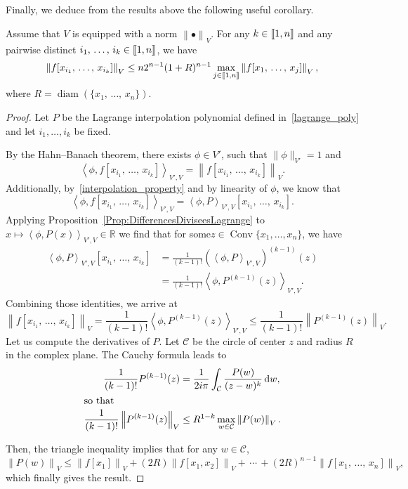 \documentclass[10pt]{amsart}
\theoremstyle{definition}\newtheorem{defi}[theo]{Definition}\newtheorem{rema}[theo]{Remark}\newtheorem{exam}[theo]{Example}\newtheorem{exem}[theo]{Example}\newtheorem{nota}[theo]{Notation}
\DeclareMathOperator{\Conv}{Conv}
\newcommand{\llbracket}{\mathopen{[\mkern -2.7mu[}}
\newcommand{\rrbracket}{\mathclose{]\mkern -2.7mu]}}
\newcommand{\inter}[2]{\llbracket #1,#2 \rrbracket}
\newcommand{\normeV}[1]{\left\| #1 \right\|_V}
\newcommand{\dualV}[2]{\left\langle #1, #2 \right\rangle_{V',V}}
\newcommand{\CC}{\mathcal{C}}
\newcommand{\R}{\mathbb{R}}
\newcommand{\md}{\mathrm{d}}
\DeclareMathOperator{\diam}{diam}
\renewcommand{\cdot}{{\scriptstyle \bullet}}
\begin{document}
Finally, we deduce from the results above the following useful corollary.
\begin{coro}\label{Coro:esti_diff_divisees_quelconques}
Assume that $V$ is equipped with a norm $\normeV{\cdot}$. For any $k\in \inter{1}{n}$ and any pairwise distinct $i_1,\,\dotsc,\,i_k\in \inter{1}{n}$, we have
\[
\normeV{f[x_{i_1},\,\dotsc,\,x_{i_k}]} \leq n 2^{n-1} (1+R)^{n-1} \max\limits_{j\in \inter{1}{n}} \normeV{f[x_1,\,\dotsc,\,x_j]},
\]
where $R=\diam(\{x_1,\,\dotsc,\,x_n\})$.
\end{coro}

\begin{proof}
Let $P$ be the Lagrange interpolation polynomial defined in~\eqref{lagrange_poly} and let $i_1,\dotsc,i_k$ be fixed.

By the Hahn--Banach theorem, there exists $\phi\in V'$, such that $\| \phi \|_{V'}=1$ and
\[
\dualV{\phi}{f[x_{i_1},\,\dotsc,\,x_{i_k}]} = \normeV{f[x_{i_1},\,\dotsc,\,x_{i_k}]}.
\]
Additionally, by~\eqref{interpolation_property} and by linearity of $\phi$, we know that
\[
\dualV{\phi}{f[x_{i_1},\,\dotsc,\,x_{i_k}]} = \dualV{\phi}{P} [x_{i_1},\,\dotsc,\,x_{i_k}].
\]
Applying Proposition~\ref{Prop:DifferencesDiviseesLagrange} to $x\mapsto \dualV{\phi}{P(x)} \in \R$ we find that for some\linebreak$z\in \Conv \{ x_1, \dots, x_n \}$, we have
\begin{align*}
\dualV{\phi}{P} [x_{i_1},\,\dotsc,\,x_{i_k}] &= \frac{1}{(k-1)!} \left(\dualV{\phi}{P}\right)^{(k-1)}(z)
\\
&= \frac{1}{(k-1)!} \dualV{\phi}{P^{(k-1)}(z)}.
\end{align*}
Combining those identities, we arrive at
\[
\normeV{f[x_{i_1},\,\dotsc,\,x_{i_k}]} = \frac{1}{(k-1)!} \dualV{\phi}{P^{(k-1)}(z)} \leq \frac{1}{(k-1)!} \normeV{P^{(k-1)}(z)}.
\]
Let us compute the derivatives of $P$. Let $\CC$ be the circle of center $z$ and radius $R$ in the complex plane. The Cauchy formula leads to
\begin{align*}
\frac{1}{(k-1)!} P^{(k-1)}(z) &= \frac{1}{2i\pi} \int_\CC \frac{P(w)}{(z-w)^k} \, \md w,
\\
\intertext{so that}
\frac{1}{(k-1)!} \normeV{P^{(k-1)}(z)} &\leq R^{1-k} \max_{w\in \CC} \normeV{P(w)}.
\end{align*}

Then, the triangle inequality implies that for any $w \in \CC$,
\[
\normeV{P(w)} \leq \normeV{f[x_1]} + (2R) \normeV{f[x_1,x_2]} +\,\cdots\,+ (2R)^{n-1} \normeV{f[x_1,\,\dotsc,\,x_n]},
\]
which finally gives the result.
\end{proof}
\end{document}
